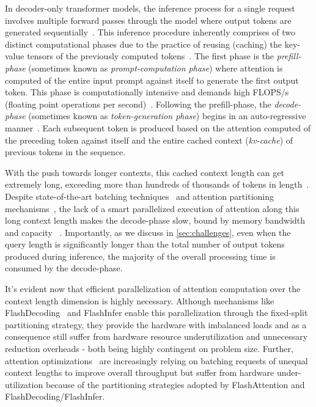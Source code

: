 In decoder-only transformer models, the inference process for a single request involves multiple forward passes through the model where output tokens are generated sequentially~\cite{fullstackoptimization}. This inference procedure inherently comprises of two distinct computational phases due to the practice of reusing (caching) the key-value tensors of the previously computed tokens~\cite{pope2023efficiently}. The first phase is the \textit{prefill-phase} (sometimes known as \textit{prompt-computation phase}) where attention is computed of the entire input prompt against itself to generate the first output token. This phase is computationally intensive and demands high FLOPS/s (floating point operations per second)~\cite{fullstackoptimization}. Following the prefill-phase, the \textit{decode-phase} (sometimes known as \textit{token-generation phase}) begins in an auto-regressive manner~\cite{vaswani2023attention}. Each subsequent token is produced based on the attention computed of the preceding token against itself and the entire cached context (\textit{kv-cache}) of previous tokens in the sequence. 

With the push towards longer contexts, this cached context length can get extremely long, exceeding more than hundreds of thousands of tokens in length~\cite{li2024longcontext,zhang2024soaring,fu2024data,liu2023ring}. Despite state-of-the-art batching techniques~\cite{yu2022orca} and attention partitioning mechanisms~\cite{dao2022flashattention, dao2023flashattention2, flashdecoding, flashinfer}, the lack of a smart parallelized execution of attention along this long context length makes the decode-phase slow, bound by memory bandwidth ~\cite{williams2009roofline} and capacity ~\cite{fullstackoptimization}. Importantly, as we discuss in \autoref{sec:challenges}, even when the query length is significantly longer than the total number of output tokens produced during inference, the majority of the overall processing time is consumed by the decode-phase.  

It's evident now that efficient parallelization of attention computation over the context length dimension is highly necessary. Although mechanisms like FlashDecoding~\cite{flashdecoding} and FlashInfer\cite{flashinfer} enable this parallelization through the fixed-split partitioning strategy, they provide the hardware with imbalanced loads and as a consequence still suffer from hardware resource underutilization and unnecessary reduction overheads -  both being highly contingent on problem size. Further, attention optimizations~\cite{sarathi} are increasingly relying on batching requests of unequal context lengths to improve overall throughput but suffer from hardware under-utilization because of the partitioning strategies adopted by FlashAttention and FlashDecoding/FlashInfer.

